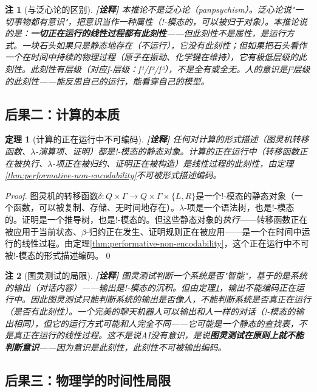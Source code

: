 \documentclass[11pt,a4paper]{article}
\newtheorem{theorem}{定理}
\newtheorem{remark}{注}
\newcommand{\lvl}[1]{\hfill\textbf{\footnotesize[#1]}}
\newcommand{\lvI}{\lvl{诠释}}
\begin{document}
\begin{remark}[与泛心论的区别]\lvI
本推论不是泛心论（panpsychism）。泛心论说"一切事物都有意识"，把意识当作一种属性（!-模态的，可以被归于对象）。本推论说的是：\textbf{一切正在运行的线性过程都有此刻性}——但此刻性不是属性，是运行方式。一块石头如果只是静态地存在（不运行），它没有此刻性；但如果把石头看作一个在时间中持续的物理过程（原子在振动、化学键在维持），它有极低层级的此刻性。此刻性有层级（对应f-层级：f¹/f²/f³），不是全有或全无。人的意识是f³层级的此刻性——能反思自己的运行，能看穿自己的模型。
\end{remark}

\subsection{后果二：计算的本质}

\begin{theorem}[计算的正在运行中不可编码]\label{thm:computation-non-encodability}\lvI
任何对计算的形式描述（图灵机转移函数、$\lambda$-演算项、证明）都是!-模态的静态对象。计算的\emph{正在运行中}（转移函数正在被执行、$\lambda$-项正在被归约、证明正在被构造）是线性过程的此刻性，由定理\ref{thm:performative-non-encodability}不可被形式描述编码。
\end{theorem}

\begin{proof}
图灵机的转移函数$\delta:Q\times\Gamma\to Q\times\Gamma\times\{L,R\}$是一个!-模态的静态对象（一个函数，可以被复制、存储、无时间地存在）。$\lambda$-项是一个语法树，也是!-模态的。证明是一个推导树，也是!-模态的。但这些静态对象的\emph{执行}——转移函数正在被应用于当前状态、$\beta$-归约正在发生、证明规则正在被应用——是一个在时间中运行的线性过程。由定理\ref{thm:performative-non-encodability}，这个正在运行中不可被!-模态的形式描述编码。\qed
\end{proof}

\begin{remark}[图灵测试的局限]\lvI
图灵测试判断一个系统是否"智能"，基于的是系统的\emph{输出}（对话内容）——输出是!-模态的沉积。但由定理\ref{thm:computation-non-encodability}，输出不能编码正在运行中。因此图灵测试只能判断系统的输出是否像人，不能判断系统是否\emph{真正在运行}（是否有此刻性）。一个完美的聊天机器人可以输出和人一样的对话（!-模态的输出相同），但它的运行方式可能和人完全不同——它可能是一个静态的查找表，不是真正在运行的线性过程。这不是说AI没有意识，是说\textbf{图灵测试在原则上就不能判断意识}——因为意识是此刻性，此刻性不可被输出编码。
\end{remark}

\subsection{后果三：物理学的时间性局限}
\end{document}
